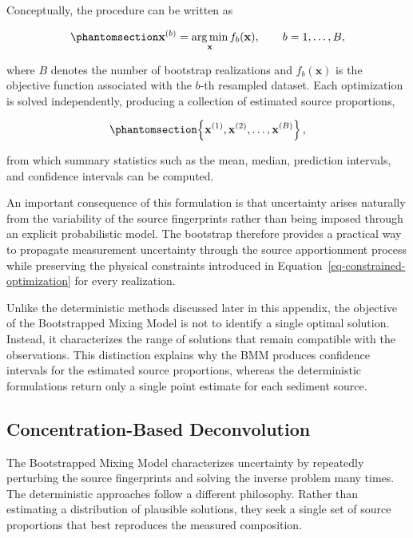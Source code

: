 \documentclass[
  12pt,
  letterpaper,
]{book}
\begin{document}
Conceptually, the procedure can be written as

\begin{equation}\phantomsection\label{eq-bootstrap-optimization}{
\mathbf{x}^{(b)}
=
\operatorname*{arg\,min}_{\mathbf{x}}
f_b(\mathbf{x}),
\qquad
b=1,\ldots,B,
}\end{equation}

where \(B\) denotes the number of bootstrap realizations and
\(f_b(\mathbf{x})\) is the objective function associated with the
\(b\)-th resampled dataset. Each optimization is solved independently,
producing a collection of estimated source proportions,

\begin{equation}\phantomsection\label{eq-bootstrap-samples}{
\left\{
\mathbf{x}^{(1)},
\mathbf{x}^{(2)},
\ldots,
\mathbf{x}^{(B)}
\right\},
}\end{equation}

from which summary statistics such as the mean, median, prediction
intervals, and confidence intervals can be computed.

An important consequence of this formulation is that uncertainty arises
naturally from the variability of the source fingerprints rather than
being imposed through an explicit probabilistic model. The bootstrap
therefore provides a practical way to propagate measurement uncertainty
through the source apportionment process while preserving the physical
constraints introduced in Equation~\ref{eq-constrained-optimization} for
every realization.

Unlike the deterministic methods discussed later in this appendix, the
objective of the Bootstrapped Mixing Model is not to identify a single
optimal solution. Instead, it characterizes the range of solutions that
remain compatible with the observations. This distinction explains why
the BMM produces confidence intervals for the estimated source
proportions, whereas the deterministic formulations return only a single
point estimate for each sediment source.

\subsection{Concentration-Based
Deconvolution}\label{concentration-based-deconvolution}

The Bootstrapped Mixing Model characterizes uncertainty by repeatedly
perturbing the source fingerprints and solving the inverse problem many
times. The deterministic approaches follow a different philosophy.
Rather than estimating a distribution of plausible solutions, they seek
a single set of source proportions that best reproduces the measured
composition.
\end{document}
